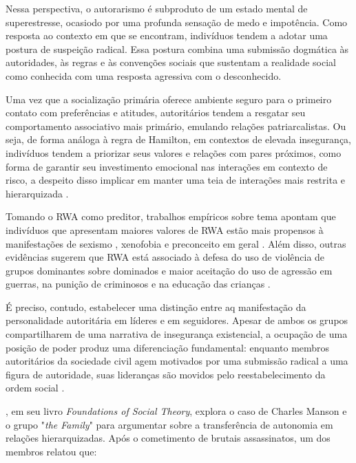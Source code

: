 \documentclass[
12pt,				%
openright,			%
twoside,			%
a4paper,			%
english,			%
french,				%
spanish,			%
brazil				%
]{abntex2}
\begin{document}
Nessa perspectiva, o autorarismo é subproduto de um estado mental de superestresse, ocasiodo por uma profunda sensação de medo e impotência. Como resposta ao contexto em que se encontram, indivíduos tendem a adotar uma postura de suspeição radical. Essa postura combina uma submissão dogmática às autoridades, às regras e às convenções sociais que sustentam a realidade social como conhecida com uma resposta agressiva com o desconhecido.

Uma vez que a socialização primária oferece ambiente seguro para o primeiro contato com preferências e atitudes, autoritários tendem a resgatar seu comportamento associativo mais primário, emulando relações patriarcalistas. Ou seja, de forma análoga à regra de Hamilton, em contextos de elevada insegurança, indivíduos tendem a priorizar seus valores e relações com pares próximos, como forma de garantir seu investimento emocional nas interações em contexto de risco, a despeito disso implicar em manter uma teia de interações mais restrita e hierarquizada \cite{ohtsuki2006cooperation}.

Tomando o RWA como preditor, trabalhos empíricos sobre tema apontam que indivíduos que apresentam maiores valores de RWA estão mais propensos à manifestações de sexismo \cite{sibley2007antecedents}, xenofobia \cite{thomsen2008we} e preconceito em geral \cite{asbrock2010right}. Além disso, outras evidências sugerem que RWA está associado à defesa do uso de violência de grupos dominantes sobre dominados \cite{henry2005social} e maior aceitação do uso de agressão em guerras, na punição de criminosos e na educação das crianças \cite{benjamin2006relationship}.

É preciso, contudo, estabelecer uma distinção entre aq manifestação da personalidade autoritária em líderes e em seguidores. Apesar de ambos os grupos compartilharem de uma narrativa de insegurança existencial, a ocupação de uma posição de poder produz uma diferenciação fundamental: enquanto membros autoritários da sociedade civil agem motivados por uma submissão radical a uma figura de autoridade, suas lideranças são movidos pelo reestabelecimento da ordem social \cite{altemeyer2006authoritarians}.

, em seu livro \emph{Foundations of Social Theory}, explora o caso de Charles Manson e o grupo "\emph{the Family}" para argumentar sobre a transferência de autonomia em relações hierarquizadas. Após o cometimento de brutais assassinatos, um dos membros relatou que:
\end{document}
